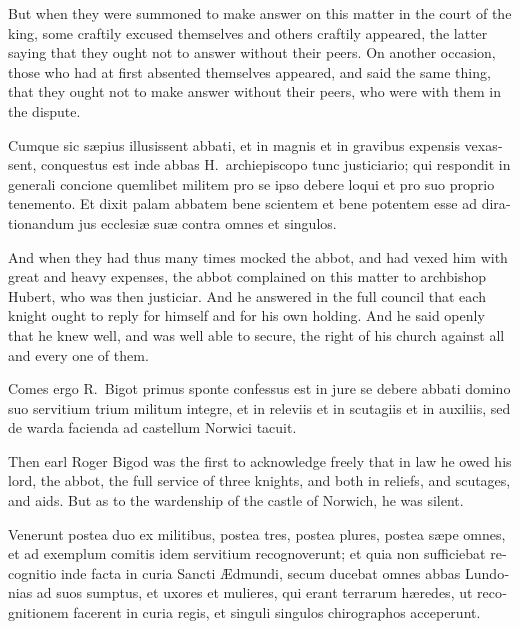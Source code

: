 \documentclass{book}
\begin{document}
\begin{paracol}{2}
\switchcolumn

But when they were summoned to make answer on this matter in the court of the king, some craftily excused themselves and others craftily appeared, the latter saying that they ought not to answer without their peers. On another occasion, those who had at first absented themselves appeared, and said the same thing, that they ought not to make answer without their peers, who were with them in the dispute.

\switchcolumn*

\begin{otherlanguage}{latin}
Cumque sic s\ae{}pius illusissent abbati, et in magnis et in gravibus expensis vexassent, conquestus est inde abbas H.\ archiepiscopo tunc justiciario; qui respondit in generali concione quemlibet militem pro se ipso debere loqui et pro suo proprio tenemento. Et dixit palam abbatem bene scientem et bene potentem esse ad dirationandum jus ecclesi\ae{} su\ae{} contra omnes et singulos.
\end{otherlanguage}

\switchcolumn

And when they had thus many times mocked the abbot, and had vexed him with great and heavy expenses, the abbot complained on this matter to archbishop Hubert, who was then justiciar. And he answered in the full council that each knight ought to reply for himself and for his own holding. And he said openly that he knew well, and was well able to secure, the right of his church against all and every one of them.

\switchcolumn*

\begin{otherlanguage}{latin}
Comes ergo R.\ Bigot primus sponte confessus est in jure se debere abbati domino suo servitium trium militum integre, et in releviis et in scutagiis et in auxiliis, sed de warda facienda ad castellum Norwici tacuit.
\end{otherlanguage}

\switchcolumn

Then earl Roger Bigod was the first to acknowledge freely that in law he owed his lord, the abbot, the full service of three knights, and both in reliefs, and scutages, and aids. But as to the wardenship of the castle of Norwich, he was silent.

\switchcolumn*

\begin{otherlanguage}{latin}
Venerunt postea duo ex militibus, postea tres, postea plures, postea s\ae{}pe omnes, et ad exemplum comitis idem servitium recognoverunt; et quia non sufficiebat recognitio inde facta in curia Sancti \AE{}dmundi, secum ducebat omnes abbas Lundonias ad suos sumptus, et uxores et mulieres, qui erant terrarum h\ae{}redes, ut recognitionem facerent in curia regis, et singuli singulos chirographos acceperunt. 
\end{otherlanguage}


\end{paracol}
\end{document}
